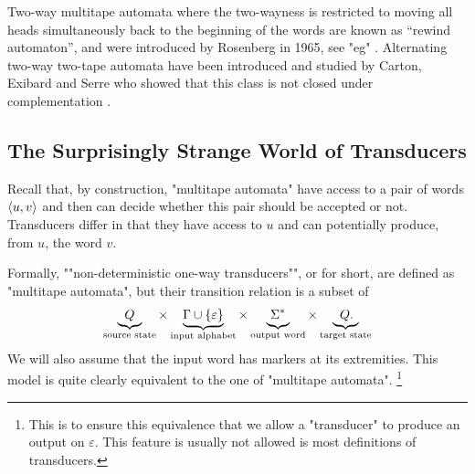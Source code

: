 Two-way multitape automata where the two-wayness is restricted to
moving all heads simultaneously back to the beginning of the words 
are known as ``rewind automaton'', and were introduced by Rosenberg in 1965,
see "eg" \cite[\S~4]{Chan1980ReversalBoundedComputations}.
Alternating two-way two-tape automata have been introduced
and studied by Carton, Exibard and Serre who
showed that this class is not closed under complementation
\cite[Theorem~1]{CartonExibardSerre2017TwoWayTwoTapeAutomata}.

\subsection{The Surprisingly Strange World of Transducers}
\label{sec:prelim-transductions}

Recall that, by construction, "multitape automata" have access to
a pair of words $\langle u,v\rangle$ and then can decide whether 
this pair should be accepted or not. 
Transducers differ in that they have access to $u$ and
can potentially produce, from $u$, the word $v$.

Formally, \AP""non-deterministic one-way transducers"",
or  for short, are defined as "multitape automata", but
their transition relation is a subset of
\[
	\underbrace{\;\;Q\;\;}_{\text{source state\vphantom{l}}}
	\times \underbrace{\Gamma \cup \{\varepsilon\}\vphantom{Q}}_{\text{input alphabet\vphantom{l}}}
	\times \underbrace{\;\Sigma^*\vphantom{Q}\;}_{\text{output word\vphantom{l}}}
	\times \underbrace{\;\;Q.\;\!\;}_{\text{target state\vphantom{l}}}
\]
We will also assume that the input word has markers at its extremities.
This model is quite clearly equivalent to the one of "multitape automata".%
\footnote{This is to ensure this equivalence that we allow
a "transducer" to produce an output on $\varepsilon$.
This feature is usually not allowed is most definitions of transducers.}

